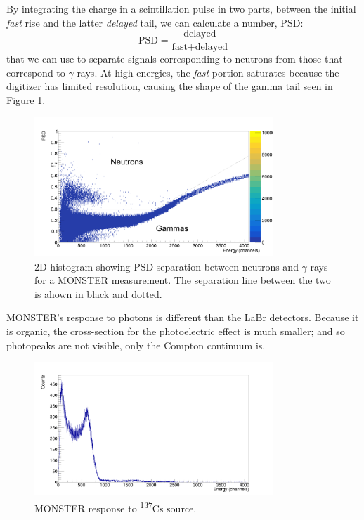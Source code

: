 \documentclass[a4paper,12pt]{report}
\begin{document}
By integrating the charge in a scintillation pulse in two parts, between the initial \textit{fast} rise and the latter \textit{delayed} tail, we can calculate a number, PSD:
\begin{equation}
	\text{PSD} = \frac{\text{delayed}}{\text{fast}+\text{delayed}}
\end{equation}
that we can use to separate signals corresponding to neutrons from those that correspond to $\gamma$-rays.
At high energies, the \textit{fast} portion saturates because the digitizer has limited resolution, causing the shape of the gamma tail seen in Figure \ref{example_psd}.

\begin{figure}[H]
	\centering
	\includegraphics[width=0.80\textwidth]{example_psd.png}
	\caption{2D histogram showing PSD separation between neutrons and $\gamma$-rays for a MONSTER measurement.
	The separation line between the two is ahown in black and dotted.}
	\label{example_psd}
\end{figure}

MONSTER's response to photons is different than the LaBr detectors.
Because it is organic, the cross-section for the photoelectric effect is much smaller; and so photopeaks are not visible, only the Compton continuum is.

\begin{figure}[H]
	\centering
	\includegraphics[width=0.80\textwidth]{monster_cs_calibration.png}
	\caption{MONSTER response to \textsuperscript{137}Cs source.}
	\label{monster_cs_calibration}
\end{figure}
\end{document}
